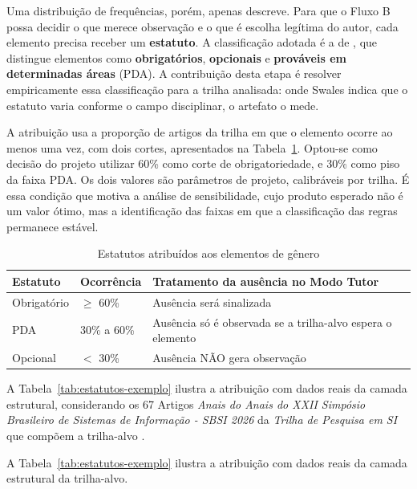 Uma distribuição de frequências, porém, apenas descreve. Para que o Fluxo B possa decidir o que merece observação e o que é escolha legítima do autor, cada elemento precisa receber um \textbf{estatuto}. A classificação adotada é a de , que distingue elementos como \textbf{obrigatórios}, \textbf{opcionais} e \textbf{prováveis em determinadas áreas} (PDA). A contribuição desta etapa é resolver empiricamente essa classificação para a trilha analisada: onde Swales indica que o estatuto varia conforme o campo disciplinar, o artefato o mede.

A atribuição usa a proporção de artigos da trilha em que o elemento ocorre ao menos uma vez, com dois cortes, apresentados na Tabela~\ref{tab:estatutos}. Optou-se como decisão do projeto utilizar 60\% como corte de obrigatoriedade, e 30\% como piso da faixa PDA. Os dois valores são parâmetros de projeto, calibráveis por trilha. É essa condição que motiva a análise de sensibilidade, cujo produto esperado não é um valor ótimo, mas a identificação das faixas em que a classificação das regras permanece estável.

\begin{table}[H]
\centering
\caption{Estatutos atribuídos aos elementos de gênero}
\label{tab:estatutos}
\small
\begin{tabular}{|p{3.2cm}|p{2.6cm}|p{7.4cm}|}
\hline
\textbf{Estatuto} & \textbf{Ocorrência} & \textbf{Tratamento da ausência no Modo Tutor} \\
\hline
Obrigatório & $\geq$ 60\% & Ausência será sinalizada \\
\hline
PDA & 30\% a 60\% & Ausência só é observada se a trilha-alvo espera o elemento \\
\hline
Opcional & $<$ 30\% & Ausência NÃO gera observação \\
\hline
\end{tabular}
\end{table}

A Tabela~\ref{tab:estatutos-exemplo} ilustra a atribuição com dados reais da
camada estrutural, considerando os 67 Artigos \textit{Anais do Anais do XXII Simpósio Brasileiro de Sistemas de Informação - SBSI 2026} da \textit{Trilha de Pesquisa em SI} que compõem a trilha-alvo .

A Tabela~\ref{tab:estatutos-exemplo} ilustra a atribuição com dados reais da
camada estrutural da trilha-alvo.

